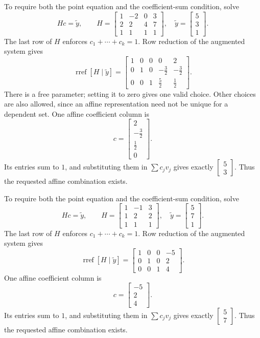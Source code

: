To require both the point equation and the coefficient-sum condition, solve
\[Hc=\widetilde y,\qquad H=\begin{bmatrix}1&-2&0&3\\2&2&4&7\\1&1&1&1\end{bmatrix},\quad\widetilde y=\begin{bmatrix}5\\3\\1\end{bmatrix}.\]
The last row of $H$ enforces $c_1+\cdots+c_k=1$. Row reduction of the augmented system gives
\[\operatorname{rref}[H\mid\widetilde y]=\begin{bmatrix}1&0&0&0&2\\0&1&0&- \frac{3}{2}&- \frac{3}{2}\\0&0&1&\frac{5}{2}&\frac{1}{2}\end{bmatrix}.\]
There is a free parameter; setting it to zero gives one valid choice. Other choices are also allowed, since an affine representation need not be unique for a dependent set.
One affine coefficient column is
\[c=\begin{bmatrix}2\\- \frac{3}{2}\\\frac{1}{2}\\0\end{bmatrix}.\]
Its entries sum to $1$, and substituting them in $\sum c_jv_j$ gives exactly $\begin{bmatrix}5\\3\end{bmatrix}$. Thus the requested affine combination exists.

To require both the point equation and the coefficient-sum condition, solve
\[Hc=\widetilde y,\qquad H=\begin{bmatrix}1&-1&3\\1&2&2\\1&1&1\end{bmatrix},\quad\widetilde y=\begin{bmatrix}5\\7\\1\end{bmatrix}.\]
The last row of $H$ enforces $c_1+\cdots+c_k=1$. Row reduction of the augmented system gives
\[\operatorname{rref}[H\mid\widetilde y]=\begin{bmatrix}1&0&0&-5\\0&1&0&2\\0&0&1&4\end{bmatrix}.\]
One affine coefficient column is
\[c=\begin{bmatrix}-5\\2\\4\end{bmatrix}.\]
Its entries sum to $1$, and substituting them in $\sum c_jv_j$ gives exactly $\begin{bmatrix}5\\7\end{bmatrix}$. Thus the requested affine combination exists.

